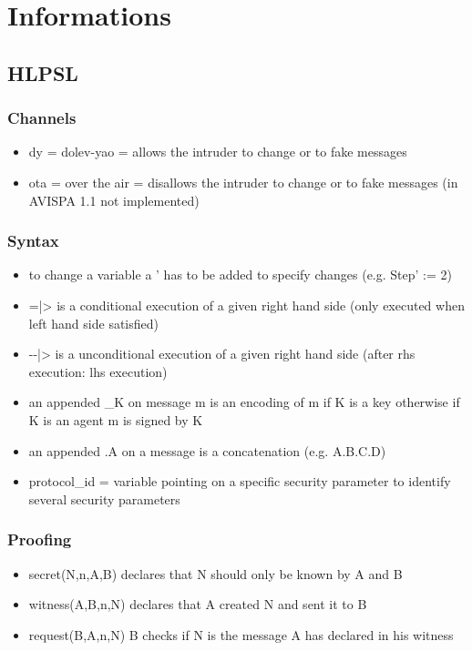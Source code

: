 \chapter{Informations}
\section{HLPSL}
\subsection{Channels}
\begin{itemize}
\item dy = dolev-yao = allows the intruder to change or to fake messages
\item ota = over the air = disallows the intruder to change or to fake messages (in AVISPA 1.1 not implemented)
\end{itemize}

\subsection{Syntax}
\begin{itemize}
\item to change a variable a ' has to be added to specify changes (e.g. Step' := 2)
\item =|> is a conditional execution of a given right hand side (only executed when left hand side satisfied)
\item -{}-|> is a unconditional execution of a given right hand side (after rhs execution: lhs execution)
\item an appended \_K on message m is an encoding of m if K is a key otherwise if K is an agent m is signed by K
\item an appended .A on a message is a concatenation (e.g. A.B.C.D)
\item protocol\_id = variable pointing on a specific security parameter to identify several security parameters
\end{itemize}

\subsection{Proofing}
\begin{itemize}
\item secret(N,n,{A,B}) declares that N should only be known by A and B
\item witness(A,B,n,N) declares that A created N and sent it to B
\item request(B,A,n,N) B checks if N is the message A has declared in his witness
\end{itemize}